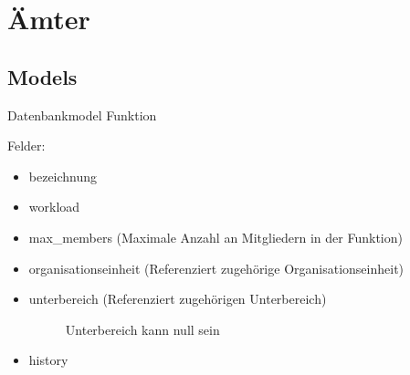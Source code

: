 \documentclass[letterpaper,10pt,english]{sphinxmanual}
\begin{document}
\section{Ämter}
\label{\detokenize{masterCodeDoc:amter}}

\subsection{Models}
\label{\detokenize{masterCodeDoc:module-aemter.models}}\label{\detokenize{masterCodeDoc:models}}

\begin{fulllineitems}
\label{\detokenize{masterCodeDoc:aemter.models.Funktion}}
Datenbankmodel Funktion

Felder:
\begin{itemize}
\item {} 
bezeichnung

\item {} 
workload

\item {} 
max\_members (Maximale Anzahl an Mitgliedern in der Funktion)

\item {} 
organisationseinheit (Referenziert zugehörige Organisationseinheit)

\item {} \begin{description}
\item[{unterbereich (Referenziert zugehörigen Unterbereich)}] \leavevmode
Unterbereich kann null sein

\end{description}

\item {} 
history

\end{itemize}

\begin{fulllineitems}
\label{\detokenize{masterCodeDoc:aemter.models.Funktion.DoesNotExist}}
\end{fulllineitems}


\end{fulllineitems}
\end{document}
